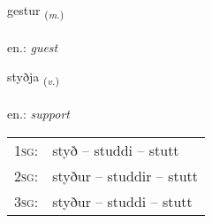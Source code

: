 \documentclass[frontgrid, backgrid]{flacards}\usepackage[]{graphicx}\usepackage[]{xcolor}
\begin{document}
\renewcommand{\blhead}{\vskip5pt {\small\bfseries\footnotesize Nafnorð | Noun }}
\renewcommand{\bcfoot}{\vskip5pt \hspace{2pt}{\small\bfseries\footnotesize 1K}}


{gestur \small{\textsubscript{(\textit{m.})}} \\[1ex] %
\textphonetic{[cɛstʏr]} \\
en.: \emph{guest} \\  [2ex]
\renewcommand*{\arraystretch}{0.8}
}

\renewcommand{\flhead}{\vskip5pt \fboxsep=0pt {\small\bfseries\footnotesize Sagnorð | Verb}}
\renewcommand{\fcfoot}{\vskip5pt \fboxsep=0pt \hspace{2pt}{\small\bfseries\footnotesize 1K}}

\renewcommand{\blhead}{\vskip5pt {\small\bfseries\footnotesize Sagnorð | Verb }}
\renewcommand{\bcfoot}{\vskip5pt \hspace{2pt}{\small\bfseries\footnotesize 1K}}


{styðja \small{\textsubscript{(\textit{v.})}} \\[1ex] %
\textphonetic{[stɪðja]} \\
en.: \emph{support} \\  [2ex]
\renewcommand*{\arraystretch}{0.8}
\begin{tabular}{p{1cm}l}
\textsc{1sg}: & styð -- studdi -- stutt \\ 
\textsc{2sg}: & styður -- studdir -- stutt \\ 
\textsc{3sg}: & styður -- studdi -- stutt \\ 
\end{tabular}
}

\renewcommand{\flhead}{\vskip5pt \fboxsep=0pt {\small\bfseries\footnotesize Nafnorð | Noun}}
\renewcommand{\fcfoot}{\vskip5pt \fboxsep=0pt \hspace{2pt}{\small\bfseries\footnotesize 1K}}
\end{document}
